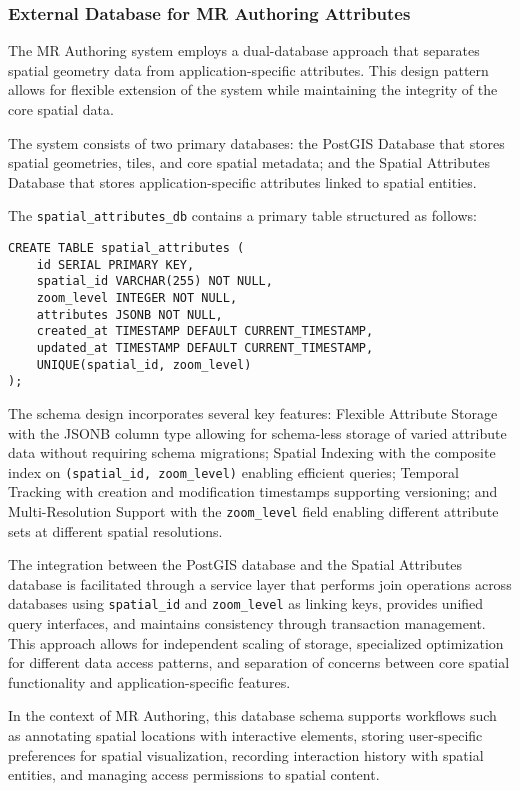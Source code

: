 \subsubsection{External Database for MR Authoring Attributes}

The MR Authoring system employs a dual-database approach that separates spatial geometry data from application-specific attributes. This design pattern allows for flexible extension of the system while maintaining the integrity of the core spatial data.

The system consists of two primary databases: the PostGIS Database that stores spatial geometries, tiles, and core spatial metadata; and the Spatial Attributes Database that stores application-specific attributes linked to spatial entities.

The \texttt{spatial\_attributes\_db} contains a primary table structured as follows:

\begin{verbatim}
CREATE TABLE spatial_attributes (
    id SERIAL PRIMARY KEY,
    spatial_id VARCHAR(255) NOT NULL,
    zoom_level INTEGER NOT NULL,
    attributes JSONB NOT NULL,
    created_at TIMESTAMP DEFAULT CURRENT_TIMESTAMP,
    updated_at TIMESTAMP DEFAULT CURRENT_TIMESTAMP,
    UNIQUE(spatial_id, zoom_level)
);
\end{verbatim}

The schema design incorporates several key features: Flexible Attribute Storage with the JSONB column type allowing for schema-less storage of varied attribute data without requiring schema migrations; Spatial Indexing with the composite index on \texttt{(spatial\_id, zoom\_level)} enabling efficient queries; Temporal Tracking with creation and modification timestamps supporting versioning; and Multi-Resolution Support with the \texttt{zoom\_level} field enabling different attribute sets at different spatial resolutions.

The integration between the PostGIS database and the Spatial Attributes database is facilitated through a service layer that performs join operations across databases using \texttt{spatial\_id} and \texttt{zoom\_level} as linking keys, provides unified query interfaces, and maintains consistency through transaction management. This approach allows for independent scaling of storage, specialized optimization for different data access patterns, and separation of concerns between core spatial functionality and application-specific features.

In the context of MR Authoring, this database schema supports workflows such as annotating spatial locations with interactive elements, storing user-specific preferences for spatial visualization, recording interaction history with spatial entities, and managing access permissions to spatial content.

